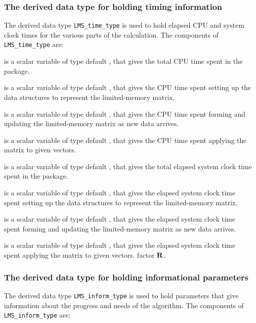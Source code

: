 \documentclass{galahad}
\newcommand{\packagename}{LMS}
\begin{document}
\subsubsection{The derived data type for holding timing
 information}\label{typetime}
The derived data type
{\tt \packagename\_time\_type}
is used to hold elapsed CPU and system clock times for the various parts of
the calculation. The components of
{\tt \packagename\_time\_type}
are:
\begin{description}
 is a scalar variable of type default \realdp, that gives
 the total CPU time spent in the package.

 is a scalar variable of type default \realdp, that gives
 the CPU time spent setting up the data structures to represent
 the limited-memory matrix.

 is a scalar variable of type default \realdp, that gives
 the CPU time spent forming and updating the limited-memory matrix
as new data arrives.

 is a scalar variable of type default \realdp, that gives
 the CPU time spent applying the matrix to given vectors.

 is a scalar variable of type default \realdp, that gives
 the total elapsed system clock time spent in the package.

 is a scalar variable of type default \realdp, that gives
 the elapsed system clock time spent setting up the data structures to
 represent the limited-memory matrix.

 is a scalar variable of type default \realdp, that gives
 the elapsed system clock time spent forming and updating the limited-memory
 matrix as new data arrives.

 is a scalar variable of type default \realdp, that gives
 the elapsed system clock time spent  applying the matrix to given vectors.
factor ${\mathbf{R}}$.

\end{description}


\subsubsection{The derived data type for holding informational
 parameters}\label{typeinform}
The derived data type
{\tt \packagename\_inform\_type}
is used to hold parameters that give information about the progress and needs
of the algorithm. The components of
{\tt \packagename\_inform\_type}
are:
\end{document}
